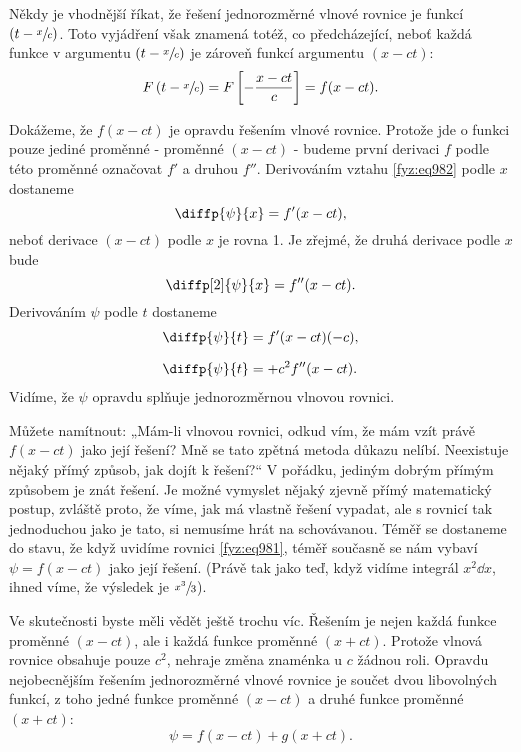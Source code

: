     Někdy je vhodnější říkat, že řešení jednorozměrné vlnové rovnice je funkcí \((t -
    \sfrac{x}{c})\). Toto vyjádření však znamená totéž, co předcházející, neboť každá funkce v
    argumentu \((t - \sfrac{x}{c})\) je zároveň funkcí argumentu \((x - ct)\):
    \begin{equation*}
      F\left(t-\sfrac{x}{c}\right)=F\left[-\dfrac{x-ct}{c}\right]=f(x-ct).
    \end{equation*}

    Dokážeme, že \(f(x - ct)\) je opravdu řešením vlnové rovnice. Protože jde o funkci pouze jediné
    proměnné - proměnné \((x - ct)\) - budeme první derivaci \(f\) podle této proměnné označovat
    \(f'\) a druhou \(f''\). Derivováním vztahu \eqref{fyz:eq982} podle \(x\) dostaneme
    \begin{equation*}
      \diffp{\psi}{x}=f'(x-ct),
    \end{equation*}
    neboť derivace \((x - ct)\) podle \(x\) je rovna 1. Je zřejmé, že druhá derivace podle \(x\)
    bude
    \begin{equation}\label{fyz:eq983}
      \diffp[2]{\psi}{x}=f''(x-ct).
    \end{equation}
    Derivováním \(\psi\) podle \(t\) dostaneme
    \begin{align}
      &\diffp{\psi}{t}=f'(x-ct)(-c),  \notag\\[1.5ex]
      &\diffp{\psi}{t}=+c^2f''(x-ct). \label{fyz:eq984}
    \end{align}
    Vidíme, že \(\psi\) opravdu splňuje jednorozměrnou vlnovou rovnici.

    Můžete namítnout: „Mám-li vlnovou rovnici, odkud vím, že mám vzít právě \(f(x- ct)\) jako její
    řešení? Mně se tato zpětná metoda důkazu nelíbí. Neexistuje nějaký přímý způsob, jak dojít k
    řešení?“ V pořádku, jediným dobrým přímým způsobem je znát řešení. Je možné vymyslet nějaký
    zjevně přímý matematický postup, zvláště proto, že víme, jak má vlastně řešení vypadat, ale s
    rovnicí tak jednoduchou jako je tato, si nemusíme hrát na schovávanou. Téměř se dostaneme do
    stavu, že když uvidíme rovnici \eqref{fyz:eq981}, téměř současně se nám vybaví \(\psi=f(x- ct)\)
    jako její řešení. (Právě tak jako teď, když vidíme integrál \(x^2\dd{x}\), ihned víme, že
    výsledek je \(\sfrac{x^3}{3}\)).
    
    Ve skutečnosti byste měli vědět ještě trochu víc. Řešením je nejen každá funkce proměnné \((x -
    ct)\), ale i každá funkce proměnné \((x + ct)\). Protože vlnová rovnice obsahuje pouze \(c^2\),
    nehraje změna znaménka u \(c\) žádnou roli. Opravdu nejobecnějším řešením jednorozměrné vlnové
    rovnice je součet dvou libovolných funkcí, z toho jedné funkce proměnné \((x - ct)\) a druhé
    funkce proměnné \((x + ct)\):
    \begin{equation}\label{fyz:eq985}
      \psi=f(x - ct)+g(x + ct).
    \end{equation}

